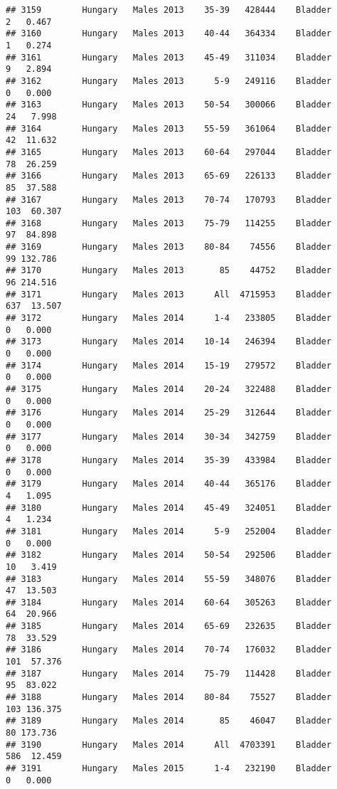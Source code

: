 \documentclass[
]{article}
\begin{document}
\begin{verbatim}
## 3159        Hungary   Males 2013    35-39   428444    Bladder      2   0.467
## 3160        Hungary   Males 2013    40-44   364334    Bladder      1   0.274
## 3161        Hungary   Males 2013    45-49   311034    Bladder      9   2.894
## 3162        Hungary   Males 2013      5-9   249116    Bladder      0   0.000
## 3163        Hungary   Males 2013    50-54   300066    Bladder     24   7.998
## 3164        Hungary   Males 2013    55-59   361064    Bladder     42  11.632
## 3165        Hungary   Males 2013    60-64   297044    Bladder     78  26.259
## 3166        Hungary   Males 2013    65-69   226133    Bladder     85  37.588
## 3167        Hungary   Males 2013    70-74   170793    Bladder    103  60.307
## 3168        Hungary   Males 2013    75-79   114255    Bladder     97  84.898
## 3169        Hungary   Males 2013    80-84    74556    Bladder     99 132.786
## 3170        Hungary   Males 2013       85    44752    Bladder     96 214.516
## 3171        Hungary   Males 2013      All  4715953    Bladder    637  13.507
## 3172        Hungary   Males 2014      1-4   233805    Bladder      0   0.000
## 3173        Hungary   Males 2014    10-14   246394    Bladder      0   0.000
## 3174        Hungary   Males 2014    15-19   279572    Bladder      0   0.000
## 3175        Hungary   Males 2014    20-24   322488    Bladder      0   0.000
## 3176        Hungary   Males 2014    25-29   312644    Bladder      0   0.000
## 3177        Hungary   Males 2014    30-34   342759    Bladder      0   0.000
## 3178        Hungary   Males 2014    35-39   433984    Bladder      0   0.000
## 3179        Hungary   Males 2014    40-44   365176    Bladder      4   1.095
## 3180        Hungary   Males 2014    45-49   324051    Bladder      4   1.234
## 3181        Hungary   Males 2014      5-9   252004    Bladder      0   0.000
## 3182        Hungary   Males 2014    50-54   292506    Bladder     10   3.419
## 3183        Hungary   Males 2014    55-59   348076    Bladder     47  13.503
## 3184        Hungary   Males 2014    60-64   305263    Bladder     64  20.966
## 3185        Hungary   Males 2014    65-69   232635    Bladder     78  33.529
## 3186        Hungary   Males 2014    70-74   176032    Bladder    101  57.376
## 3187        Hungary   Males 2014    75-79   114428    Bladder     95  83.022
## 3188        Hungary   Males 2014    80-84    75527    Bladder    103 136.375
## 3189        Hungary   Males 2014       85    46047    Bladder     80 173.736
## 3190        Hungary   Males 2014      All  4703391    Bladder    586  12.459
## 3191        Hungary   Males 2015      1-4   232190    Bladder      0   0.000

\end{verbatim}
\end{document}

